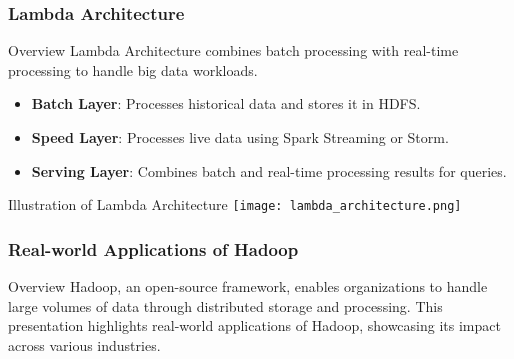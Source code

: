 \documentclass[aspectratio=169]{beamer}
\begin{document}
\begin{frame}[fragile]
    \frametitle{Lambda Architecture}
    \begin{block}{Overview}
    Lambda Architecture combines batch processing with real-time processing to handle big data workloads.
    \end{block}

    \begin{itemize}
        \item \textbf{Batch Layer}: Processes historical data and stores it in HDFS.
        \item \textbf{Speed Layer}: Processes live data using Spark Streaming or Storm.
        \item \textbf{Serving Layer}: Combines batch and real-time processing results for queries.
    \end{itemize}

    \begin{block}{Illustration of Lambda Architecture}
        \texttt{[image: lambda\_architecture.png]} %
    \end{block}
\end{frame}

\begin{frame}[fragile]
    \frametitle{Real-world Applications of Hadoop}
    \begin{block}{Overview}
        Hadoop, an open-source framework, enables organizations to handle large volumes of data through distributed storage and processing. 
        This presentation highlights real-world applications of Hadoop, showcasing its impact across various industries.
    \end{block}
\end{frame}
\end{document}
